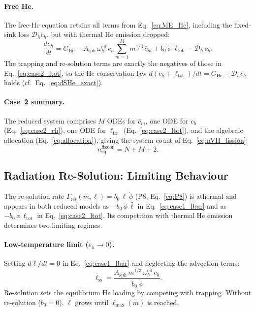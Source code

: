 \paragraph{Free He.}
The free-He equation retains all terms from Eq.~\eqref{eq:ME_He},
including the fixed-sink loss $\mathcal{D}_h c_h$, but with thermal
He emission dropped:
\begin{equation}\label{eq:case2_ch}
    \frac{dc_h}{dt}
    = G_{\mathrm{He}}
    - A_{\mathrm{sph}}\,\omega_h^{\mathrm{eff}}\,c_h
      \sum_{m=1}^{M} m^{1/3}\,\bar{c}_m
    + b_0\,\dot{\phi}\,\ell_{\mathrm{tot}}
    - \mathcal{D}_h\,c_h.
\end{equation}
The trapping and re-solution terms are exactly the negatives of those
in Eq.~\eqref{eq:case2_ltot}, so the He conservation law
$d(c_h + \ell_{\mathrm{tot}})/dt = G_{\mathrm{He}} - \mathcal{D}_h c_h$
holds (cf.\ Eq.~\ref{eq:dSHe_exact}).

\paragraph{Case~2 summary.}
The reduced system comprises $M$ ODEs for $\bar{c}_m$, one ODE for
$c_h$ (Eq.~\ref{eq:case2_ch}), one ODE for $\ell_{\mathrm{tot}}$
(Eq.~\ref{eq:case2_ltot}), and the algebraic allocation
(Eq.~\ref{eq:allocation}), giving the system count of
Eq.~\eqref{eq:nVH_fission}:
\begin{equation*}
    n_{\mathrm{eq}}^{\mathrm{fission}} = N + M + 2.
\end{equation*}

\subsection{Radiation Re-Solution: Limiting Behaviour}
\label{sec:resolution_limits}

The re-solution rate $\Gamma_{\mathrm{res}}(m,\ell) = b_0\,\ell\,\dot{\phi}$
(P8, Eq.~\ref{eq:P8}) is athermal and appears in both reduced models as
$-b_0\,\dot{\phi}\,\bar{\ell}$ in Eq.~\eqref{eq:case1_lbar} and as
$-b_0\,\dot{\phi}\,\ell_{\mathrm{tot}}$ in Eq.~\eqref{eq:case2_ltot}.
Its competition with thermal He emission determines two limiting regimes.

\paragraph{Low-temperature limit ($\varepsilon_h \to 0$).}
Setting $d\bar{\ell}/dt = 0$ in Eq.~\eqref{eq:case1_lbar} and
neglecting the advection terms:
\begin{equation}\label{eq:lbar_ss_lowT}
    \bar{\ell}_{\mathrm{ss}}
    = \frac{A_{\mathrm{sph}}\,m^{1/3}\,\omega_h^{\mathrm{eff}}\,c_h}
           {b_0\,\dot{\phi}}.
\end{equation}
Re-solution sets the equilibrium He loading by competing with trapping.
Without re-solution ($b_0 = 0$), $\bar{\ell}$ grows until
$\ell_{\max}(m)$ is reached.

